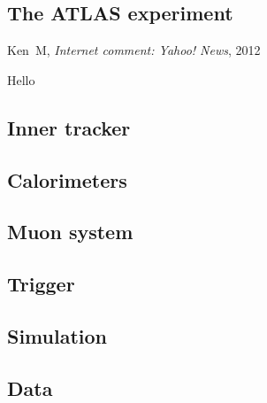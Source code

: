 \begin{singlespacing}
\chapter{The ATLAS experiment}
\label{chapter:experiment}
%
\begin{epigraphs}
%
{Ken~M,
\textit{Internet comment: Yahoo! News},
2012~\cite{kenm2012inner}}
\end{epigraphs}
\end{singlespacing}

Hello


\section{Inner tracker}
\label{sec:atlas_tracker}

\section{Calorimeters}
\label{sec:atlas_calo}


\section{Muon system}
\label{sec:atlas_muon}

\section{Trigger}
\label{sec:atlas_trigger}

\section{Simulation}
\label{sec:atlas_simulation}

\section{Data}
\label{sec:atlas_data}


